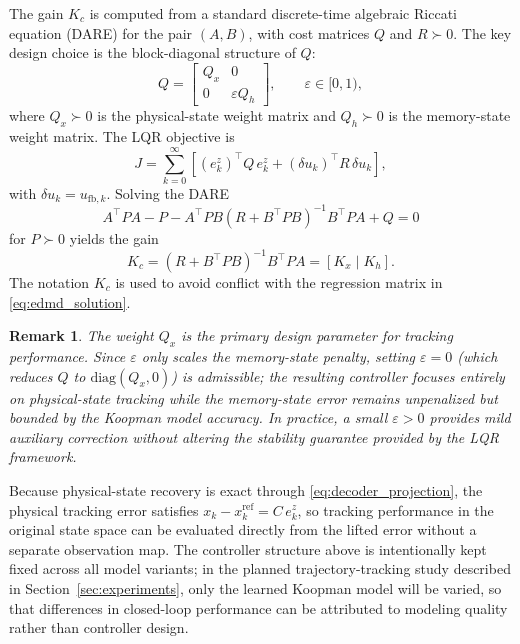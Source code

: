 \documentclass[journal]{IEEEtran}
\newtheorem{remark}{Remark}
\begin{document}
The gain $K_c$ is computed from a standard discrete-time algebraic Riccati equation (DARE) for the pair $(A,B)$, with cost matrices $Q$ and $R \succ 0$. The key design choice is the block-diagonal structure of $Q$:
\begin{equation}
    Q = \begin{bmatrix} Q_x & 0 \\ 0 & \varepsilon Q_h \end{bmatrix},
    \qquad \varepsilon \in [0,1),
    \label{eq:block_diag_Q}
\end{equation}
where $Q_x \succ 0$ is the physical-state weight matrix and $Q_h \succ 0$ is the memory-state weight matrix. The LQR objective is
\begin{equation}
    J = \sum_{k=0}^{\infty}
    \left[(e_k^z)^\top Q\, e_k^z + (\delta u_k)^\top R\,\delta u_k\right],
    \label{eq:lqr_objective}
\end{equation}
with $\delta u_k = u_{\mathrm{fb},k}$. Solving the DARE
\begin{equation}
    A^\top P A - P - A^\top P B(R + B^\top P B)^{-1}B^\top P A + Q = 0
    \label{eq:dare}
\end{equation}
for $P \succ 0$ yields the gain
\begin{equation}
    K_c = (R + B^\top P B)^{-1}B^\top P A = [K_x\;|\;K_h].
    \label{eq:lqr_gain}
\end{equation}
The notation $K_c$ is used to avoid conflict with the regression matrix in \eqref{eq:edmd_solution}.

\begin{remark}
The weight $Q_x$ is the primary design parameter for tracking performance.
Since $\varepsilon$ only scales the memory-state penalty, setting
$\varepsilon = 0$ (which reduces $Q$ to $\mathrm{diag}(Q_x, 0)$) is
admissible; the resulting controller focuses entirely on physical-state
tracking while the memory-state error remains unpenalized but bounded by
the Koopman model accuracy. In practice, a small $\varepsilon > 0$ provides
mild auxiliary correction without altering the stability guarantee provided
by the LQR framework.
\end{remark}

Because physical-state recovery is exact through \eqref{eq:decoder_projection}, the physical tracking error satisfies $x_k - x_k^{\mathrm{ref}} = C\,e_k^z$, so tracking performance in the original state space can be evaluated directly from the lifted error without a separate observation map. The controller structure above is intentionally kept fixed across all model variants; in the planned trajectory-tracking study described in Section~\ref{sec:experiments}, only the learned Koopman model will be varied, so that differences in closed-loop performance can be attributed to modeling quality rather than controller design.
\end{document}
